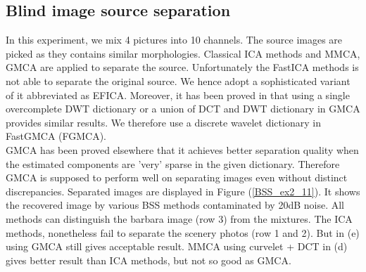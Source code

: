 \newpage
\subsection{Blind image source separation}
In this experiment, we mix 4 pictures into 10 channels. The source images are picked as they contains similar morphologies. Classical ICA methods and MMCA, GMCA are applied to separate the source. Unfortunately the FastICA methods is not able to separate the original source. We hence adopt a sophisticated variant of it abbreviated as EFICA. Moreover, it has been proved in \cite{BobinJ_2007SaMD} that using a single overcomplete DWT dictionary or a union of DCT and DWT dictionary in GMCA provides similar results. We therefore use a discrete wavelet dictionary in FastGMCA (FGMCA).\\


GMCA has been proved elsewhere \cite{BobinJ_2007SaMD} that it achieves better separation quality when the estimated components are 'very' sparse in the given dictionary. Therefore GMCA is supposed to perform well on separating images even without distinct discrepancies. Separated images are displayed in Figure (\ref{BSS_ex2_11}). It shows the recovered image by various BSS methods contaminated by 20dB noise. All methods can distinguish the barbara image (row 3) from the mixtures. The ICA methods, nonetheless fail to separate the scenery photos (row 1 and 2). But in (e) using GMCA still gives acceptable result. MMCA using curvelet + DCT in (d) gives better result than ICA methods, but not so good as GMCA.\\


